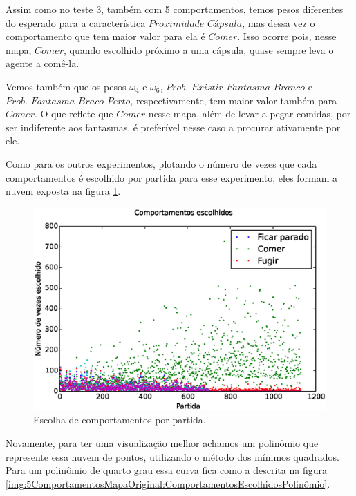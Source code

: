 Assim como no teste 3, também com 5 comportamentos, temos pesos diferentes do esperado para a característica $ \textit{Proximidade Cápsula} $, mas dessa vez o comportamento que tem maior valor para ela é $ Comer $. Isso ocorre pois, nesse mapa, $ Comer $, quando escolhido próximo a uma cápsula, quase sempre leva o agente a comê-la.

Vemos também que os pesos $ \omega_4 $ e $ \omega_6 $, $ \textit{Prob. Existir Fantasma Branco} $ e $ \textit{Prob. Fantasma Braco Perto} $, respectivamente, tem maior valor também para $ Comer $. O que reflete que $ Comer $ nesse mapa, além de levar a pegar comidas, por ser indiferente aos fantasmas, é preferível nesse caso a procurar ativamente por ele.

Como para os outros experimentos, plotando o número de vezes que cada comportamentos é escolhido por partida para esse experimento, eles formam a nuvem exposta na figura \ref{img:5ComportamentosMapaOriginal:ComportamentosEscolhidos}.

\begin{figure}[H]
    \centering
    \includegraphics[width=\linewidth]{images/5_behaviors_original_map/chosen_behaviors}
    \caption{Escolha de comportamentos por partida.}
    \label{img:5ComportamentosMapaOriginal:ComportamentosEscolhidos}
\end{figure}

Novamente, para ter uma visualização melhor achamos um polinômio que represente essa nuvem de pontos, utilizando o método dos mínimos quadrados. Para um polinômio de quarto grau essa curva fica como a descrita na figura \ref{img:5ComportamentosMapaOriginal:ComportamentosEscolhidosPolinômio}.

